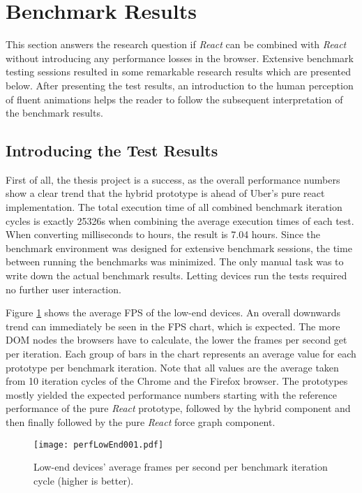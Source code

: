 \section{Benchmark Results}

This section answers the research question if \emph{React} can be combined with \emph{React} without introducing any performance losses in the browser. Extensive benchmark testing sessions resulted in some remarkable research results which are presented below. After presenting the test results, an introduction to the human perception of fluent animations helps the reader to follow the subsequent interpretation of the benchmark results.

\subsection{Introducing the Test Results}

First of all, the thesis project is a success, as the overall performance numbers show a clear trend that the hybrid prototype is ahead of Uber's pure react implementation. The total execution time of all combined benchmark iteration cycles is exactly 25326s when combining the average execution times of each test. When converting milliseconds to hours, the result is 7.04 hours. Since the benchmark environment was designed for extensive benchmark sessions, the time between running the benchmarks was minimized. The only manual task was to write down the actual benchmark results. Letting devices run the tests required no further user interaction. 

Figure \ref{fig:perfLowEnd001} shows the average FPS of the low-end devices. An overall downwards trend can immediately be seen in the FPS chart, which is expected. The more DOM nodes the browsers have to calculate, the lower the frames per second get per iteration. Each group of bars in the chart represents an average value for each prototype per benchmark iteration. Note that all values are the average taken from 10 iteration cycles of the Chrome and the Firefox browser. The prototypes mostly yielded the expected performance numbers starting with the reference performance of the pure \emph{React} prototype, followed by the hybrid component and then finally followed by the pure \emph{React} force graph component.

\begin{figure}
\centering
\texttt{[image: perfLowEnd001.pdf]}
\caption{Low-end devices' average frames per second per benchmark iteration cycle (higher is better).}
\label{fig:perfLowEnd001}
\end{figure}

